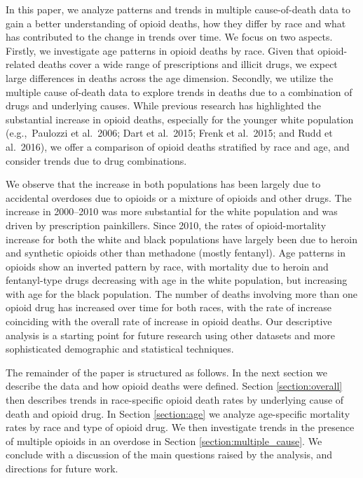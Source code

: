 \documentclass[12pt, a4paper]{article}
\begin{document}
In this paper, we analyze patterns and trends in multiple cause-of-death data to gain a better understanding of opioid deaths, how they differ by race and what has contributed to the change in trends over time. We focus on two aspects. Firstly, we investigate age patterns in opioid deaths by race. Given that opioid-related deaths cover a wide range of prescriptions and illicit drugs, we expect large differences in deaths across the age dimension. Secondly, we utilize the multiple cause of-death data to explore trends in deaths due to a combination of drugs and underlying causes. While previous research has highlighted the substantial increase in opioid deaths, especially for the younger white population (e.g.,\ Paulozzi et al.\ 2006; Dart et al.\ 2015; Frenk et al.\ 2015; and Rudd et al.\ 2016), we offer a comparison of opioid deaths stratified by race and age, and consider trends due to drug combinations. 

We observe that the increase in both populations has been largely due to accidental overdoses due to opioids or a mixture of opioids and other drugs. The increase in 2000--2010 was more substantial for the white population and was driven by prescription painkillers. Since 2010, the rates of opioid-mortality increase for both the white and black populations have largely been due to heroin and synthetic opioids other than methadone (mostly fentanyl). Age patterns in opioids show an inverted pattern by race, with mortality due to heroin and fentanyl-type drugs decreasing with age in the white population, but increasing with age for the black population. The number of deaths involving more than one opioid drug has increased over time for both races, with the rate of increase coinciding with the overall rate of increase in opioid deaths. Our descriptive analysis is a starting point for future research using other datasets and more sophisticated demographic and statistical techniques.

The remainder of the paper is structured as follows. In the next section we describe the data and how opioid deaths were defined. Section \ref{section:overall} then describes trends in race-specific opioid death rates by underlying cause of death and opioid drug. In Section \ref{section:age} we analyze age-specific mortality rates by race and type of opioid drug. We then investigate trends in the presence of multiple opioids in an overdose in Section \ref{section:multiple_cause}. We conclude with a discussion of the main questions raised by the analysis, and directions for future work. 
\end{document}
